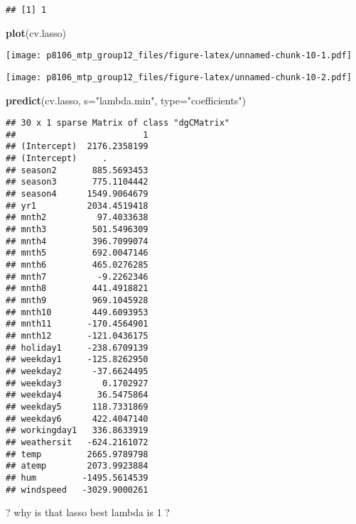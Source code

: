 \documentclass[]{article}
\newenvironment{Shaded}{\begin{snugshade}}{\end{snugshade}}
\newcommand{\KeywordTok}[1]{\textcolor[rgb]{0.13,0.29,0.53}{\textbf{#1}}}
\newcommand{\DataTypeTok}[1]{\textcolor[rgb]{0.13,0.29,0.53}{#1}}
\newcommand{\StringTok}[1]{\textcolor[rgb]{0.31,0.60,0.02}{#1}}
\newcommand{\OperatorTok}[1]{\textcolor[rgb]{0.81,0.36,0.00}{\textbf{#1}}}
\newcommand{\NormalTok}[1]{#1}
\begin{document}
\begin{verbatim}
## [1] 1
\end{verbatim}

\begin{Shaded}
\begin{Highlighting}[]
\KeywordTok{plot}\NormalTok{(cv.lasso)}
\end{Highlighting}
\end{Shaded}

\texttt{[image: p8106\_mtp\_group12\_files/figure-latex/unnamed-chunk-10-1.pdf]}

\begin{Shaded}
\end{Shaded}

\texttt{[image: p8106\_mtp\_group12\_files/figure-latex/unnamed-chunk-10-2.pdf]}

\begin{Shaded}
\begin{Highlighting}[]
\KeywordTok{predict}\NormalTok{(cv.lasso, }\DataTypeTok{s=}\StringTok{"lambda.min"}\NormalTok{, }\DataTypeTok{type=}\StringTok{"coefficients"}\NormalTok{)}
\end{Highlighting}
\end{Shaded}

\begin{verbatim}
## 30 x 1 sparse Matrix of class "dgCMatrix"
##                         1
## (Intercept)  2176.2358199
## (Intercept)     .        
## season2       885.5693453
## season3       775.1104442
## season4      1549.9064679
## yr1          2034.4519418
## mnth2          97.4033638
## mnth3         501.5496309
## mnth4         396.7099074
## mnth5         692.0047146
## mnth6         465.0276285
## mnth7          -9.2262346
## mnth8         441.4918821
## mnth9         969.1045928
## mnth10        449.6093953
## mnth11       -170.4564901
## mnth12       -121.0436175
## holiday1     -238.6709139
## weekday1     -125.8262950
## weekday2      -37.6624495
## weekday3        0.1702927
## weekday4       36.5475864
## weekday5      118.7331869
## weekday6      422.4047140
## workingday1   336.8633919
## weathersit   -624.2161072
## temp         2665.9789798
## atemp        2073.9923884
## hum         -1495.5614539
## windspeed   -3029.9000261
\end{verbatim}

? why is that lasso best lambda is 1 ?
\end{document}
